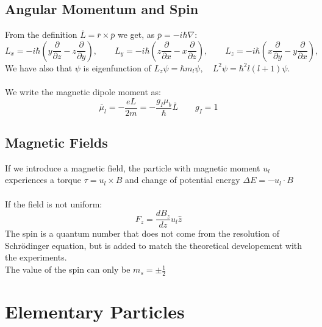 \documentclass{myclass}
\newcommand{\h}{\hbar}
\newcommand{\N}{\nabla}
\begin{document}
\subsection{Angular Momentum and Spin}
From the definition $\overline{L} = \overline{r}\times \overline{p}$ we get, as $\overline{p} = -i\h \N  $:
 \[
L_x=-i\hbar\left(y\frac{\partial}{\partial z} - z\frac{\partial}{\partial y} \right), \qquad
L_y=-i\hbar\left(z\frac{\partial}{\partial x} - x\frac{\partial}{\partial z} \right), \qquad
L_z=-i\hbar\left(x\frac{\partial}{\partial y} - y\frac{\partial}{\partial x} \right), \qquad
\] 
We have also that $\psi$ is eigenfunction of $L_z\psi = \h m_l \psi, \quad L^2 \psi = \h^2l\left( l+1 \right)\psi $. \\
\\
We write the magnetic dipole moment as:
\[
\overline{\mu}_l = -\frac{eL}{2m} =-\frac{g_I\mu_b}{\h}\overline{L} \qquad g_I = 1
\] 
\subsection{Magnetic Fields}
If we introduce a magnetic field, the particle with magnetic moment $u_l$ experiences a torque $\tau = u_l \times B$ and change of potential energy  $\Delta E = -u_l \cdot B$ \\
\\
If the field is not uniform:
\[
F_z = \frac{dB_z}{dz} u_l \hat{z}
\] 
The spin is a quantum number that does not come from the resolution of Schrödinger equation, but is added to match the theoretical developement with the experiments. \\
The value of the spin can only be $m_s = \pm \frac{1}{2}$

\section{Elementary Particles}
\end{document}
